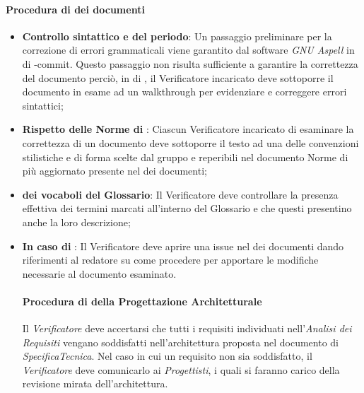 \paragraph*{Procedura di  dei documenti}
\begin{itemize}
\item \textbf{Controllo sintattico e del periodo}: Un passaggio preliminare per la correzione di errori grammaticali viene garantito dal software \textit{GNU Aspell} in  di -commit. Questo passaggio non risulta sufficiente a garantire la correttezza del documento perciò, in  di , il Verificatore incaricato deve sottoporre il documento in esame ad un walkthrough per evidenziare e correggere errori sintattici;
  \item \textbf{Rispetto delle Norme di }: Ciascun Verificatore incaricato di esaminare la correttezza di un documento deve sottoporre il testo ad una  delle convenzioni stilistiche e di forma scelte dal gruppo e reperibili nel documento Norme di  pi\`u aggiornato presente nel  dei documenti;
  \item \textbf{ dei vocaboli del Glossario}: Il Verificatore deve controllare la presenza effettiva dei termini marcati all'interno del Glossario e che questi presentino anche la loro descrizione;
  \item \textbf{In caso di }: Il Verificatore deve aprire una issue nel  dei documenti dando riferimenti al redatore su come procedere per apportare le modifiche necessarie al documento esaminato.

\paragraph*{Procedura di  della Progettazione Architetturale}
Il \textit{Verificatore} deve accertarsi che tutti i requisiti individuati nell'\textit{Analisi dei Requisiti} vengano soddisfatti
nell'architettura proposta nel documento di \textit{SpecificaTecnica}.
Nel caso in cui un requisito non sia soddisfatto, il \textit{Verificatore} deve comunicarlo ai \textit{Progettisti}, i quali
si faranno carico della revisione mirata dell'architettura. 

\end{itemize}

